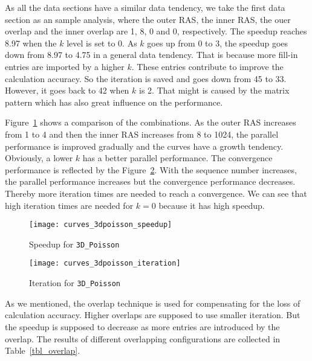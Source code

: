 \documentclass[runningheads,a4paper]{llncs}
\begin{document}
{As all the data sections have a similar data tendency, we take the first data section as an sample analysis, where the outer RAS, the inner RAS, the ouer overlap and the inner overlap are 1, 8, 0 and 0, respectively. The speedup reaches 8.97 when the $k$ level is set to 0. As $k$ goes up from 0 to 3, the speedup goes down from 8.97 to 4.75 in a general data tendency. That is because more fill-in entries are imported by a higher $k$. These entries contribute to improve the calculation accuracy. So the iteration is saved and goes down from 45 to 33. However, it goes back to 42 when $k$ is 2. That might is caused by the matrix pattern which has also great influence on the performance.

Figure~\ref{fig_3dpoisson_speedup} shows a comparison of the combinations. As the outer RAS increases from 1 to 4 and then the inner RAS increases from 8 to 1024, the parallel performance is improved gradually and the curves have a growth tendency. Obviously, a lower $k$ has a better parallel performance. The convergence performance is reflected by the Figure~\ref{fig_3dpoisson_iteration}. With the sequence number increases, the parallel performance increases but the convergence performance decreases. Thereby more iteration times are needed to reach a convergence. We can see that high iteration times are needed for $k=0$ because it has high speedup.

\begin{figure}[!tbh]
    \centering
    \texttt{[image: curves\_3dpoisson\_speedup]}
    \caption{Speedup for \texttt{3D\_Poisson}}
    \label{fig_3dpoisson_speedup}
\end{figure}

\begin{figure}[!tbh]
    \centering
    \texttt{[image: curves\_3dpoisson\_iteration]}
    \caption{Iteration for \texttt{3D\_Poisson}}
    \label{fig_3dpoisson_iteration}
\end{figure}

As we mentioned, the overlap technique is used for compensating for the loss of calculation accuracy. Higher overlaps are supposed to use smaller iteration. But the speedup is supposed to decrease as more entries are introduced by the overlap. The results of different overlapping configurations are collected in Table~\ref{tbl_overlap}.

}
\end{document}
